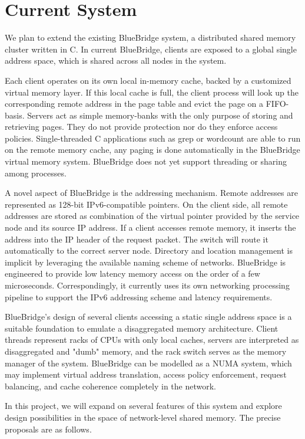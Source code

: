 \section{Current System}
\label{sec:current}
We plan to extend the existing BlueBridge system, a distributed shared memory cluster written in C. In current BlueBridge, clients are exposed to a global single address space, which is shared across all nodes in the system.

Each client operates on its own local in-memory cache, backed by a customized virtual memory layer.
If this local cache is full, the client process will look up the corresponding remote address in the page table and evict the page on a FIFO-basis.
Servers act as simple memory-banks with the only purpose of storing and retrieving pages. They do not provide protection nor do they enforce access policies.
Single-threaded C applications such as grep or wordcount are able to run on the remote memory cache, any paging is done automatically in the BlueBridge virtual memory system.
BlueBridge does not yet support threading or sharing among processes.

A novel aspect of BlueBridge is the addressing mechanism. Remote addresses are represented as 128-bit IPv6-compatible pointers. On the client side, all remote addresses are stored as combination of the virtual pointer provided by the service node and its source IP address. If a client accesses remote memory, it inserts the address into the IP header of the request packet. The switch will route it automatically to the correct server node. Directory and location management is implicit by leveraging the available naming scheme of networks.
BlueBridge is engineered to provide low latency memory access on the order of a few microseconds. Correspondingly, it currently uses its own networking processing pipeline to support the IPv6 addressing scheme and latency requirements.

BlueBridge's design of several clients accessing a static single address space is a suitable foundation to emulate a disaggregated memory architecture. Client threads represent racks of CPUs with only local caches, servers are interpreted as disaggregated and "dumb" memory, and the rack switch serves as the memory manager of the system.
BlueBridge can be modelled as a NUMA system, which may implement virtual address translation, access policy enforcement, request balancing, and cache coherence completely in the network.

In this project, we will expand on several features of this system and explore design possibilities in the space of network-level shared memory. The precise proposals are as follows.

